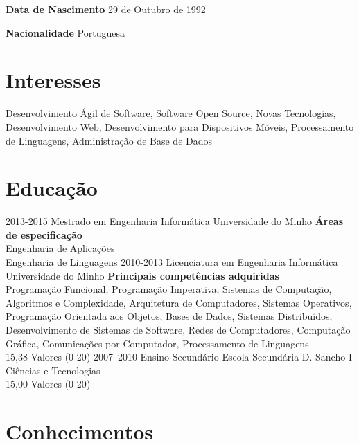 \documentclass[]{friggeri-cv}
\begin{document}
\begin{multicols}{2}
\textbf{Data de Nascimento} 29 de Outubro de 1992 

\textbf{Nacionalidade} Portuguesa
\end{multicols}

\section{Interesses}

Desenvolvimento Ágil de Software, Software Open Source, Novas Tecnologias, Desenvolvimento Web, Desenvolvimento para Dispositivos 
Móveis, Processamento de Linguagens, Administração de Base de Dados

\section{Educação}

\begin{entrylist}
  \entry
    {2013-2015}
    {Mestrado em Engenharia Informática}
    {Universidade do Minho}
    {{\bf Áreas de especificação}\\
    Engenharia de Aplicações\\
    Engenharia de Linguagens}
  \entry
    {2010-2013}
    {Licenciatura em Engenharia Informática}
    {Universidade do Minho}
    {{\bf Principais competências adquiridas} \\ 
    Programação Funcional, Programação Imperativa, 
    Sistemas de Computação, Algoritmos e Complexidade, 
    Arquitetura de Computadores, Sistemas Operativos, 
    Programação Orientada aos Objetos, Bases de Dados,
    Sistemas Distribuídos, Desenvolvimento de Sistemas de Software,
    Redes de Computadores, Computação Gráfica,
    Comunicações por Computador, Processamento de Linguagens
    \\ 15,38 Valores (0-20)}
  \entry
    {2007–2010}
    {Ensino Secundário}
    {Escola Secundária D. Sancho I}
    {Ciências e Tecnologias \\ 15,00 Valores (0-20)}
\end{entrylist}
\newpage
\section{Conhecimentos}
\end{document}
